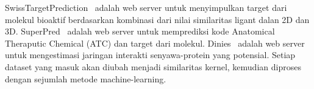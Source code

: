 SwissTargetPrediction~\cite{HeckerAEDMEGBP12} adalah web server untuk menyimpulkan target dari molekul bioaktif berdasarkan kombinasi dari nilai similaritas ligant dalan 2D dan 3D.
SuperPred~\cite{superpred} adalah web server untuk memprediksi kode Anatomical Theraputic Chemical (ATC) dan target dari molekul.
Dinies~\cite{YamanishiKMSKG14} adalah web server untuk mengestimasi jaringan interakti senyawa-protein yang potensial.
Setiap dataset yang masuk akan diubah menjadi similaritas kernel, kemudian diproses dengan sejumlah metode machine-learning.

